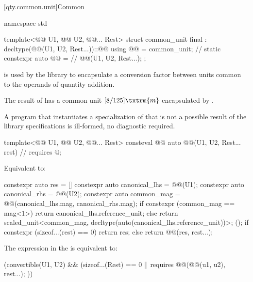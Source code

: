 [qty.common.unit]{Common}

\begin{codeblock}
namespace std {

template<@@ U1, @@ U2, @@... Rest>
struct common_unit final : decltype(@@(U1{}, U2{}, Rest{}...))::@@
{
  using @@ = common_unit;       // \expos
  static constexpr auto @@ =  // \expos
    @@(U1{}, U2{}, Rest{}...);
};

}
\end{codeblock}

\pnum
{} is used by the library
to encapsulate a conversion factor between units
common to the operands of quantity addition.
\begin{example}
The result of 
has a common unit $[8/125] \txtrm{ m}$
encapsulated by .
\end{example}
A program that instantiates a specialization of 
that is not a possible result of the library specifications
is ill-formed, no diagnostic required.

\begin{itemdecl}
template<@@ U1, @@ U2, @@... Rest>
consteval @@ auto @@(U1, U2, Rest... rest)  // \expos
  requires @\seebelownc@;
\end{itemdecl}

\begin{itemdescr}
\pnum
\effects
Equivalent to:
\begin{codeblock}
constexpr auto res = [] {
  constexpr auto canonical_lhs = @@(U1{});
  constexpr auto canonical_rhs = @@(U2{});
  constexpr auto common_mag = @@(canonical_lhs.mag, canonical_rhs.mag);
  if constexpr (common_mag == mag<1>)
    return canonical_lhs.reference_unit;
  else
    return scaled_unit<common_mag, decltype(auto(canonical_lhs.reference_unit))>{};
}();
if constexpr (sizeof...(rest) == 0)
  return res;
else
  return @@(res, rest...);
\end{codeblock}

\pnum
\remarks
The expression in the  is equivalent to:
\begin{codeblock}
(convertible(U1{}, U2{}) && (sizeof...(Rest) == 0 || requires {
   @@(@@(u1, u2), rest...);
 }))
\end{codeblock}
\end{itemdescr}

